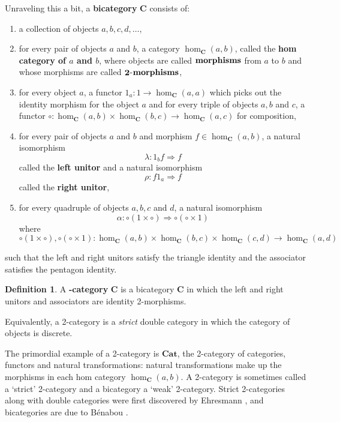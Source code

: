 \documentclass[oneside,final]{ucr}
\theoremstyle{definition}
\newtheorem{definition}[theorem]{Definition}
\newcommand{\define}[1]{{\bf \boldmath #1}}
\begin{document}
{Unraveling this a bit, a \define{bicategory} $\mathbf{C}$ consists of:
\begin{enumerate}
\item{a collection of objects $a,b,c,d,\ldots$,}
\item{for every pair of objects $a$ and $b$, a category $\hom_{\mathbf{C}}(a,b)$, called the \define{hom category of $a$ and $b$}, where objects are called $\define{morphisms}$ from $a$ to $b$ and whose morphisms are called $\define{2}$-$\define{morphisms}$,}
\item{for every object $a$, a functor $1_a \colon 1 \to \hom_\mathbf{C}(a,a)$ which picks out the identity morphism for the object $a$ and for every triple of objects $a,b$ and $c$, a functor $\circ \colon \hom_\mathbf{C}(a,b) \times \hom_\mathbf{C}(b,c) \to \hom_\mathbf{C}(a,c)$ for composition,}
\item{for every pair of objects $a$ and $b$ and morphism $f \in \hom_{\mathbf{C}}(a,b)$, a natural isomorphism $$\lambda \colon 1_b f \Rightarrow f$$called the \define{left unitor} and a natural isomorphism $$\rho \colon f 1_a \Rightarrow f$$called the \define{right unitor},}
\item{for every quadruple of objects $a,b,c$ and $d$, a natural isomorphism $$\alpha \colon \circ (1 \times \circ) \Rightarrow \circ (\circ \times 1)$$where$$\circ(1 \times \circ),\circ (\circ \times 1) \colon \hom_{\mathbf{C}}(a,b) \times \hom_{\mathbf{C}}(b,c) \times \hom_{\mathbf{C}}(c,d) \to \hom_{\mathbf{C}}(a,d)$$}
\end{enumerate}
such that the left and right unitors satisfy the triangle identity and the associator satisfies the pentagon identity.


\begin{definition}\label{2-cat_definition}
A \define{2-category} $\mathbf{C}$ is a bicategory $\mathbf{C}$ in which the left and right unitors and associators are identity 2-morphisms.
\end{definition}
Equivalently, a 2-category is a \emph{strict} double category in which the category of objects is discrete.

The primordial example of a 2-category is $\mathbf{Cat}$, the 2-category of categories, functors and natural transformations: natural transformations make up the morphisms in each hom category $\hom_\mathbf{C}(a,b)$.
A 2-category is sometimes called a `strict' 2-category and a bicategory a `weak' 2-category.
Strict 2-categories along with double categories were first discovered by Ehresmann \cite{Ehresmann63, Ehresmann65}, and bicategories are due to B\'enabou \cite{Be}.

}
\end{document}
